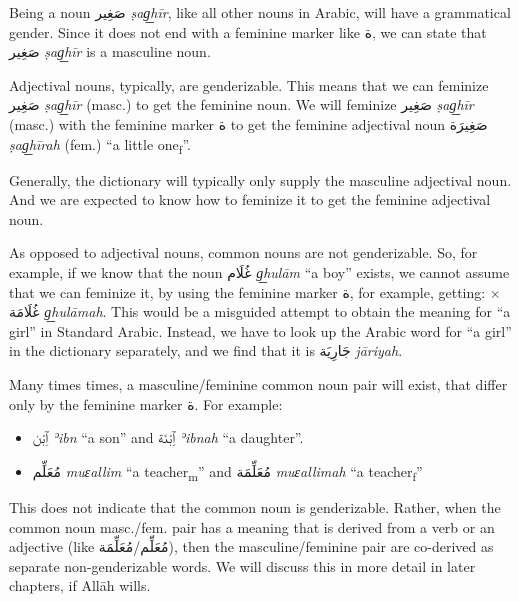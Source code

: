 \documentclass[
  10pt,
]{book}
\providecommand{\tightlist}{%
  \setlength{\itemsep}{0pt}\setlength{\parskip}{0pt}}
\begin{document}
Being a noun \foreignlanguage{arabic}{صَغِير} \emph{ṣag͟hīr}, like all other nouns in Arabic, will have a grammatical gender. Since it does not end with a feminine marker like \foreignlanguage{arabic}{ة}, we can state that
\foreignlanguage{arabic}{صَغِير} \emph{ṣag͟hīr} is a masculine noun.

Adjectival nouns, typically, are genderizable. This means that we can feminize
\foreignlanguage{arabic}{صَغِير} \emph{ṣag͟hīr} (masc.) to get the feminine noun.
We will feminize
\foreignlanguage{arabic}{صَغِير} \emph{ṣag͟hīr} (masc.) with the feminine marker \foreignlanguage{arabic}{ة} to get the feminine adjectival noun
\foreignlanguage{arabic}{صَغِيرَة} \emph{ṣag͟hīrah} (fem.) \enquote{a little one\textsubscript{f}}.

Generally, the dictionary will typically only supply the masculine adjectival noun.
And we are expected to know how to feminize it to get the feminine adjectival noun.

As opposed to adjectival nouns, common nouns are not genderizable. So, for example, if we know that the noun
\foreignlanguage{arabic}{غُلَام} \emph{g͟hulām} \enquote{a boy} exists, we cannot assume that we can feminize it, by using the feminine marker \foreignlanguage{arabic}{ة}, for example, getting: \(\times\) \foreignlanguage{arabic}{غُلَامَة} \emph{g͟hulāmah}. This would be a misguided attempt to obtain the meaning for \enquote{a girl} in Standard Arabic. Instead, we have to look up the Arabic word for \enquote{a girl} in the dictionary separately, and we find that it is \foreignlanguage{arabic}{جَارِيَة} \emph{jāriyah}.

Many times times, a masculine/feminine common noun pair will exist, that differ only by the feminine marker \foreignlanguage{arabic}{ة}. For example:

\begin{itemize}
\tightlist
\item
  \foreignlanguage{arabic}{ٱِبْن} \emph{ʾibn} \enquote{a son} and \foreignlanguage{arabic}{ٱِبْنَة} \emph{ʾibnah} \enquote{a daughter}.
\item
  \foreignlanguage{arabic}{مُعَلِّم} \emph{muɛallim} \enquote{a teacher\textsubscript{m}} and \foreignlanguage{arabic}{مُعَلِّمَة} \emph{muɛallimah} \enquote{a teacher\textsubscript{f}}
\end{itemize}

This does not indicate that the common noun is genderizable. Rather, when the common noun masc./fem. pair has a meaning that is derived from a verb or an adjective (like
\foreignlanguage{arabic}{مُعَلِّم}/\foreignlanguage{arabic}{مُعَلِّمَة}),
then the masculine/feminine pair are co-derived as separate non-genderizable words. We will discuss this in more detail in later chapters, if Allāh wills.
\end{document}
